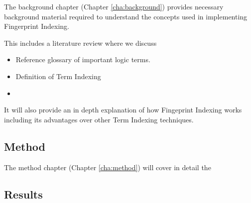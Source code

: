 The background chapter (Chapter \ref{cha:background}) provides necessary background material required to understand
the concepts used in implementing Fingerprint Indexing.

This includes a literature review where we discuss 
\begin{itemize}
\item Reference glossary of important logic terms.
\item Definition of Term Indexing
\item
\end{itemize}

It will also provide
an in depth explanation of how Fingeprint Indexing works including its advantages
over other Term Indexing techniques.

\subsection{Method}

The method chapter (Chapter \ref{cha:method}) will cover in detail the 

\subsection{Results}

